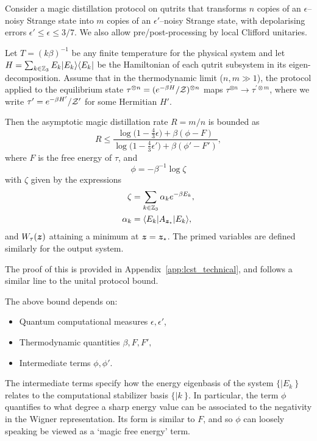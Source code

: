 \documentclass[pra,
aps,
twocolumn,
superscriptaddress,
groupedaddress,
nofootinbib,
reprint
]{revtex4-1}
\begin{document}
\begin{theorem}\label{thm:free-energy}
	Consider a magic distillation protocol on qutrits that transforms $n$ copies of an $\epsilon$--noisy Strange state into $m$ copies of an $\epsilon'$--noisy Strange state, with depolarising errors $\epsilon' \leq \epsilon \leq 3/7$. We also allow pre/post-processing by local Clifford unitaries.
	
	Let $T =(k\beta)^{-1}$ be any finite temperature for the physical system and let $H= \sum_{k \in \mathbb{Z}_3} E_k |E_k\rangle\langle E_k|$ be the Hamiltonian of each qutrit subsystem in its eigen-decomposition.
Assume that in the thermodynamic limit ($n,m \gg 1$), the protocol applied to the equilibrium state $\tau^{\otimes n} = (e^{-\beta H}/\mathcal{Z})^{\otimes n}$ maps $\tau^{\otimes n} \longrightarrow \tau^{\prime \otimes m}$, where we write $\tau' = e^{-\beta H'}/\mathcal{Z}'$ for some Hermitian $H'$.

Then the asymptotic magic distillation rate $R = m/n$ is bounded as
\begin{equation}\label{eq:rate_bounds_proof}
	R \leq \dfrac{\log \big( 1-\frac{4}{3}\epsilon \big) + \beta (\phi - F)}{\log \big( 1-\frac{4}{3}\epsilon' \big) + \beta (\phi' - F')},
\end{equation}
where $F$ is the free energy of $\tau$,  and 
\begin{equation}\label{eq:phi}
	\phi = -\beta^{-1} \log \zeta
\end{equation}
with $\zeta$ given by the expressions
\begin{align}
	\zeta &= \sum_{k\in \mathbb{Z}_3} \alpha_k e^{-\beta E_k}, \\
	\alpha_k &= \langle E_k| A_{\bm{z}_\star} |E_k\rangle,
\end{align}
and $W_\tau(\bm{z})$ attaining a minimum at $\bm{z}=\bm{z}_\star$. The primed variables are defined similarly for the output system.
\end{theorem}
\noindent The proof of this is provided in Appendix~\ref{app:lcst_technical}, and follows a similar line to the unital protocol bound.

The above bound depends on: 
\begin{itemize}
\item Quantum computational measures $\epsilon, \epsilon'$,
\item Thermodynamic quantities $\beta, F, F',$
\item Intermediate terms $\phi, \phi'$. 
\end{itemize}
The intermediate terms specify how the energy eigenbasis of the system $\{|E_k\>\}$ relates to the computational stabilizer basis $\{|k\>\}$.  In particular, the term $\phi$ quantifies to what degree a sharp energy value can be associated to the negativity in the Wigner representation. Its form is similar to $F$, and so $\phi$ can loosely speaking be viewed as a `magic free energy' term. 
\end{document}
